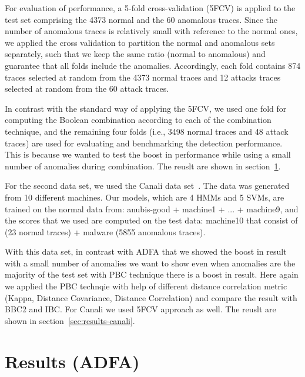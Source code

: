 For evaluation of performance, a 5-fold cross-validation (5FCV) is applied to the test set comprising the 4373 normal and the 60 anomalous traces.
Since the number of anomalous traces is relatively small with reference to the normal ones, we applied the cross validation to partition the normal and anomalous sets separately, such that we keep the same ratio (normal to anomalous) and guarantee that all folds include the anomalies.
Accordingly, each fold contains 874 traces selected at random from the 4373 normal traces and 12 attacks traces selected at random from the 60 attack traces.

In contrast with the standard way of applying the 5FCV, we used one fold for computing the Boolean combination according to each of the combination technique,
and the remaining four folds (i.e., 3498 normal traces and 48 attack traces) are used for evaluating and benchmarking the detection performance.
This is because we wanted to test the boost in performance while using a small number of anomalies during combination. The reuslt are shown in section~\ref{sec:results-ADFA}.

For the second data set, we used the Canali data set~\cite{Canali2012}. The data was generated from 10 different machines. Our models, which are 4 HMMs and 5 SVMs, are trained on the normal data from: anubis-good + machine1 + ... + machine9, and the scores that we used are computed on the test data: machine10 that consist of (23 normal traces) + malware (5855 anomalous traces).

With this data set, in contrast with ADFA that we showed the boost in result with a small number of anomalies we want to show even when  anomalies are the majority of the test set with PBC technique there is a boost in result.
Here again we applied the PBC technqie with help of different distance correlation metric (Kappa, Distance Covariance, Distance Correlation) and compare the result with BBC2 and IBC. For Canali we used 5FCV approach as well. The reuslt are shown in section~\ref{sec:results-canali}.



\section{Results (ADFA)}
\label{sec:results-ADFA}



